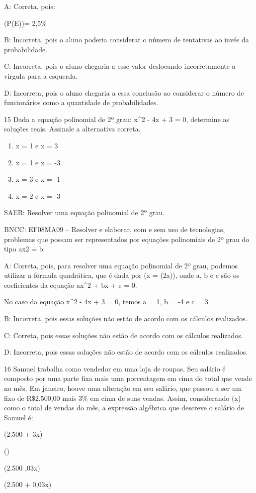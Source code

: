 {A: Correta, pois:

(P(E))= 2,5\%

B: Incorreta, pois o aluno poderia considerar o número de tentativas ao
invés da probabilidade.

C: Incorreta, pois o aluno chegaria a esse valor deslocando
incorretamente a virgula para a esquerda.

D: Incorreta, pois o aluno chegaria a essa conclusão ao considerar o
número de funcionários como a quantidade de probabilidades.

\num{15} Dada a equação polinomial de 2º grau: x^2 - 4x + 3 = 0, determine as
soluções reais. Assinale a alternativa correta.

\begin{enumerate}
\def\labelenumi{\alph{enumi})}
\item
  x = 1 e x = 3
\item
  x = 1 e x = -3
\item
  x = 3 e x = -1
\item
  x = 2 e x = -3
\end{enumerate}

SAEB: Resolver uma equação polinomial de 2º grau.

BNCC: EF08MA09 -- Resolver e elaborar, com e sem uso de tecnologias,
problemas que possam ser representados por equações polinomiais de 2º
grau do tipo ax2 = b.

A: Correta, pois, para resolver uma equação polinomial de 2º grau,
podemos utilizar a fórmula quadrática, que é dada por
(x =  {(2a)}), onde a, b e c são os
coeficientes da equação ax^2 + bx + c = 0.

No caso da equação x^2 - 4x + 3 = 0, temos a = 1, b = -4 e c = 3.

B: Incorreta, pois essas soluções não estão de acordo com os cálculos
realizados.

C: Correta, pois essas soluções não estão de acordo com os cálculos
realizados.

D: Incorreta, pois essas soluções não estão de acordo com os cálculos
realizados.

\num{16} Samuel trabalha como vendedor em uma loja de roupas. Seu salário é
composto por uma parte fixa mais uma porcentagem em cima do total que
vende no mês. Em janeiro, houve uma alteração em seu salário, que passou
a ser um fixo de R\$2.500,00 mais 3\% em cima de suas vendas. Assim,
considerando (x) como o total de vendas do mês, a expressão algébrica
que descreve o salário de Samuel é:
\item (2.500 + 3x)
\item ()
\item (2.500 ,03x)
\item (2.500 + 0,03x)

}
